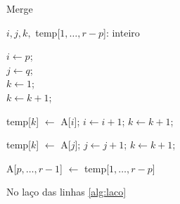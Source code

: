 \documentclass[10pt,a4paper,twocolumn]{book}
\begin{document}
		\begin{algorithm}[h]
			\caption{{\sc Merge }}
			\DontPrintSemicolon %
			$i, j, k,$ temp[$1, \ldots, r-p$]: inteiro 
			
			$i \gets p$;\\
			$j \gets q$;\\
			$k \gets 1$;\\
			
			{
				\label{alg:laco}
				$k \gets k + 1$;
			}
			
			{
				temp[$k$] $\gets$ A[$i$];\;
				$i \gets i + 1$;\;
				$k \gets k + 1$;
			}
			
			{
				temp[$k$] $\gets$ A[$j$];\; 
				$j \gets j + 1$;\;
				$k \gets k + 1$;
			}			
			
			A[$p , \ldots, r-1$] $\gets$ temp[$1, \ldots, r-p$]\;
			\;
			\label{algo:selectionsort}
		\end{algorithm}	
		
		No laço das linhas \ref{alg:laco}
			
\end{document}
